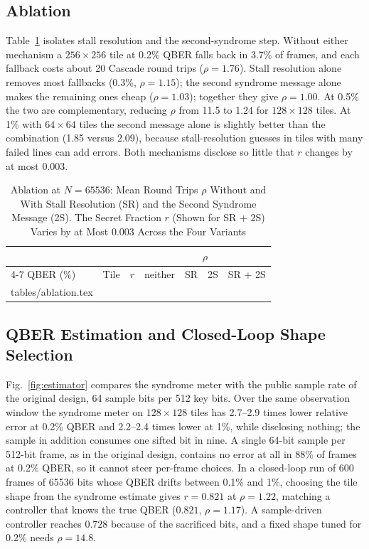 \documentclass[conference]{IEEEtran}
\makeatletter
\newcommand{\tablerows}[1]{\@@input #1 }
\makeatother
\begin{document}
\subsection{Ablation}
Table~\ref{tab:ablation} isolates stall resolution and the second-syndrome step. Without either mechanism a $256\times256$ tile at 0.2\% QBER falls back in 3.7\% of frames, and each fallback costs about 20 Cascade round trips ($\rho=1.76$). Stall resolution alone removes most fallbacks (0.3\%, $\rho=1.15$); the second syndrome message alone makes the remaining ones cheap ($\rho=1.03$); together they give $\rho=1.00$. At 0.5\% the two are complementary, reducing $\rho$ from 11.5 to 1.24 for $128\times128$ tiles. At 1\% with $64\times64$ tiles the second message alone is slightly better than the combination (1.85 versus 2.09), because stall-resolution guesses in tiles with many failed lines can add errors. Both mechanisms disclose so little that $r$ changes by at most 0.003.

\begin{table}[t]
\caption{Ablation at $N=65536$: Mean Round Trips $\rho$ Without and With Stall Resolution (SR) and the Second Syndrome Message (2S). The Secret Fraction $r$ (Shown for SR + 2S) Varies by at Most 0.003 Across the Four Variants}
\label{tab:ablation}
\centering
\setlength{\tabcolsep}{4pt}
\begin{tabular}{@{}llccccc@{}}
\toprule
& & & \multicolumn{4}{c}{$\rho$}\\
\cmidrule(l){4-7}
QBER (\%) & Tile & $r$ & neither & SR & 2S & SR + 2S\\
\midrule
\tablerows{tables/ablation.tex}
\bottomrule
\end{tabular}
\end{table}

\subsection{QBER Estimation and Closed-Loop Shape Selection}
Fig.~\ref{fig:estimator} compares the syndrome meter with the public sample rate of the original design, 64 sample bits per 512 key bits. Over the same observation window the syndrome meter on $128\times128$ tiles has 2.7--2.9 times lower relative error at 0.2\% QBER and 2.2--2.4 times lower at 1\%, while disclosing nothing; the sample in addition consumes one sifted bit in nine. A single 64-bit sample per 512-bit frame, as in the original design, contains no error at all in 88\% of frames at 0.2\% QBER, so it cannot steer per-frame choices. In a closed-loop run of 600 frames of 65536 bits whose QBER drifts between 0.1\% and 1\%, choosing the tile shape from the syndrome estimate gives $r=0.821$ at $\rho=1.22$, matching a controller that knows the true QBER ($0.821$, $\rho=1.17$). A sample-driven controller reaches $0.728$ because of the sacrificed bits, and a fixed shape tuned for 0.2\% needs $\rho=14.8$.
\end{document}
